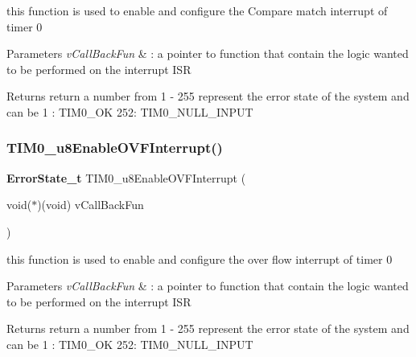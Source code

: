 this function is used to enable and configure the Compare match interrupt of timer 0 


\begin{DoxyParams}{Parameters}
{\em v\+Call\+Back\+Fun} & \+: a pointer to function that contain the logic wanted to be performed on the interrupt I\+SR \\
\hline
\end{DoxyParams}
\begin{DoxyReturn}{Returns}
return a number from 1 -\/ 255 represent the error state of the system and can be 1 \+: T\+I\+M0\+\_\+\+OK 252\+: T\+I\+M0\+\_\+\+N\+U\+L\+L\+\_\+\+I\+N\+P\+UT 
\end{DoxyReturn}
\mbox{\label{_t_i_m_e_r0__interface_8h_a1d94b9fccfdcbb336ed7f975cc947730}} 
\subsubsection{T\+I\+M0\+\_\+u8\+Enable\+O\+V\+F\+Interrupt()}
{\footnotesize\ttfamily \textbf{ Error\+State\+\_\+t} T\+I\+M0\+\_\+u8\+Enable\+O\+V\+F\+Interrupt (\begin{DoxyParamCaption}\item[{void($\ast$)(void)}]{v\+Call\+Back\+Fun }\end{DoxyParamCaption})}



this function is used to enable and configure the over flow interrupt of timer 0 


\begin{DoxyParams}{Parameters}
{\em v\+Call\+Back\+Fun} & \+: a pointer to function that contain the logic wanted to be performed on the interrupt I\+SR \\
\hline
\end{DoxyParams}
\begin{DoxyReturn}{Returns}
return a number from 1 -\/ 255 represent the error state of the system and can be 1 \+: T\+I\+M0\+\_\+\+OK 252\+: T\+I\+M0\+\_\+\+N\+U\+L\+L\+\_\+\+I\+N\+P\+UT 
\end{DoxyReturn}
\mbox{\label{_t_i_m_e_r0__interface_8h_affaf298d5dadbb9ea2c5b0782b49b30c}} 
